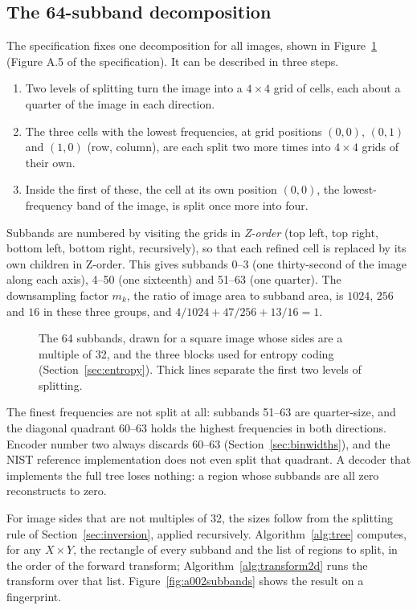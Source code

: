 \subsection{The 64-subband decomposition}
\label{sec:subbands}

The specification fixes one decomposition for all images, shown in Figure~\ref{fig:subbands}
(Figure A.5 of the specification). It can be described in three steps.
\begin{enumerate}
  \item Two levels of splitting turn the image into a $4 \times 4$ grid of cells, each about
    a quarter of the image in each direction.
  \item The three cells with the lowest frequencies, at grid positions $(0,0)$, $(0,1)$ and
    $(1,0)$ (row, column), are each split two more times into $4 \times 4$ grids of their own.
  \item Inside the first of these, the cell at its own position $(0,0)$, the lowest-frequency
    band of the image, is split once more into four.
\end{enumerate}
Subbands are numbered by visiting the grids in \emph{Z-order} (top left, top right, bottom
left, bottom right, recursively), so that each refined cell is replaced by its own children in
Z-order. This gives subbands 0--3 (one thirty-second of the image along each axis), 4--50 (one
sixteenth) and 51--63 (one quarter). The downsampling factor $m_k$, the ratio of image area to
subband area, is $1024$, $256$ and $16$ in these three groups, and
$4/1024 + 47/256 + 13/16 = 1$.

\begin{figure}[ht]
  \centering
  
  \caption{The 64 subbands, drawn for a square image whose sides are a multiple of 32, and the
  three blocks used for entropy coding (Section~\ref{sec:entropy}). Thick lines separate the
  first two levels of splitting.}
  \label{fig:subbands}
\end{figure}

The finest frequencies are not split at all: subbands 51--63 are quarter-size, and the
diagonal quadrant 60--63 holds the highest frequencies in both directions. Encoder number two
always discards 60--63 (Section~\ref{sec:binwidths}), and the NIST reference implementation
does not even split that quadrant. A decoder that implements the full tree loses nothing: a
region whose subbands are all zero reconstructs to zero.

For image sides that are not multiples of 32, the sizes follow from the splitting rule of
Section~\ref{sec:inversion}, applied recursively. Algorithm~\ref{alg:tree} computes, for any
$X \times Y$, the rectangle of every subband and the list of regions to split, in the order of
the forward transform; Algorithm~\ref{alg:transform2d} runs the transform over that list.
Figure~\ref{fig:a002subbands} shows the result on a fingerprint.

